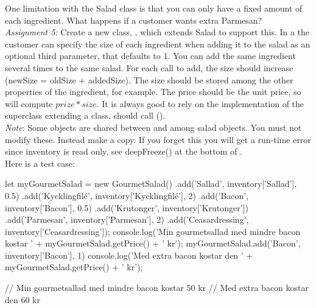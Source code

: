 \documentclass[fleqn, article, a4paper]{memoir}
\begin{document}
\begin{Assignments}
\item One limitation with the Salad class is that you can only have a fixed amount of each ingredient. What happens if a customer wants extra Parmesan?
\\\emph{Assignment 5:} 
Create a new class, , which extends Salad to support this. In a  the customer can specify the size of each ingredient when adding it to the salad as an optional third parameter, that defaults to 1. You can add the same ingredient several times to the same salad. For each call to add, the size should increase (newSize = oldSize + addedSize). The size should be stored among the other properties of the ingredient, for example. The price should be the unit price, so  will compute $prize*size$.
It is always good to rely on the implementation of the superclass extending a class.  should call  ().
\\\emph{Note}: Some objects are shared between  and among salad objects. You must not modify these. Instead make a copy. If you forget this you will get a run-time error since inventory is read only, see deepFreeze() at the bottom of .
\\ Here is a test case:
\begin{Code}
let myGourmetSalad = new GourmetSalad()
.add('Sallad', inventory['Sallad'], 0.5)
.add('Kycklingfilé', inventory['Kycklingfilé'], 2)
.add('Bacon', inventory['Bacon'], 0.5)
.add('Krutonger', inventory['Krutonger'])
.add('Parmesan', inventory['Parmesan'], 2)
.add('Ceasardressing', inventory['Ceasardressing']);
console.log('Min gourmetsallad med mindre bacon kostar '
    + myGourmetSalad.getPrice() + ' kr');
myGourmetSalad.add('Bacon', inventory['Bacon'], 1)
console.log('Med extra bacon kostar den '
    + myGourmetSalad.getPrice() + ' kr');

// Min gourmetsallad med mindre bacon kostar 50 kr
// Med extra bacon kostar den 60 kr
\end{Code}


\end{Assignments}
\end{document}
